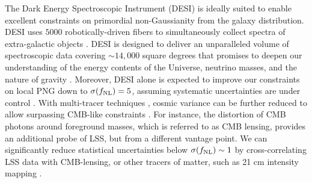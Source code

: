 The Dark Energy Spectroscopic Instrument (DESI) is ideally suited to enable excellent constraints on primordial non-Gaussianity from the galaxy distribution. DESI uses $5000$ robotically-driven fibers to simultaneously collect spectra of extra-galactic objects \citep{2013arXiv1308.0847L, 2016arXiv161100037D, 2023AJ....165....9S}. DESI is designed to deliver an unparalleled volume of spectroscopic data covering $\sim 14,000$ square degrees that promises to deepen our understanding of the energy contents of the Universe, neutrino masses, and the nature of gravity \citep{2022AJ....164..207D}. Moreover, DESI alone is expected to improve our constraints on local PNG down to $\sigma(f_{\rm NL})=5$, assuming systematic uncertainties are under control \citep{aghamousa2016desi}. With multi-tracer techniques \citep{PhysRevLett.102.021302}, cosmic variance can be further reduced to allow surpassing CMB-like constraints \citep{2015ApJ...814..145A}. For instance, the distortion of CMB photons around foreground masses, which is referred to as CMB lensing, provides an additional probe of LSS, but from a different vantage point. We can significantly reduce statistical uncertainties below $\sigma(f_{\rm NL})\sim 1$ by cross-correlating LSS data with CMB-lensing, or other tracers of matter, such as 21 cm intensity mapping  \citep[see, e.g.,][]{schmittfull2018PhRvD, Heinrich2022AAS...24020203H, 2023arXiv230102406J, 2023arXiv230308901S}.  
 
